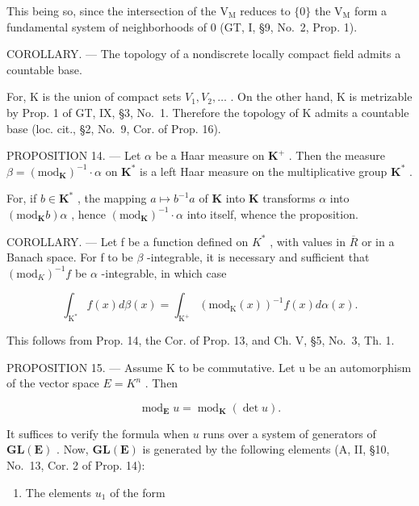 This being so, since the intersection of the \(\mathrm{V_M}\) reduces to \(\{0\}\) the \(\mathrm{V_M}\) form a fundamental system of neighborhoods of 0 (GT, I, §9, No.~2, Prop. 1).

COROLLARY. --- The topology of a nondiscrete locally compact field admits a countable base.

For, K is the union of compact sets \(V_{1}, V_{2}, \ldots\) . On the other hand, K is metrizable by Prop. 1 of GT, IX, §3, No.~1. Therefore the topology of K admits a countable base (loc. cit., §2, No.~9, Cor. of Prop. 16).

PROPOSITION 14. --- Let \(\alpha\) be a Haar measure on \(\mathbf{K}^{+}\) . Then the measure \(\beta = (\mathrm{mod}_{\mathbf{K}})^{-1} \cdot \alpha\) on \(\mathbf{K}^{*}\) is a left Haar measure on the multiplicative group \(\mathbf{K}^{*}\) .

For, if \(b \in \mathbf{K}^*\) , the mapping \(a \mapsto b^{-1}a\) of \(\mathbf{K}\) into \(\mathbf{K}\) transforms \(\alpha\) into \((\mathrm{mod}_{\mathbf{K}}b)\alpha\) , hence \((\mathrm{mod}_{\mathbf{K}})^{-1} \cdot \alpha\) into itself, whence the proposition.

COROLLARY. --- Let f be a function defined on \(K^{*}\) , with values in \(\overline{R}\) or in a Banach space. For f to be \(\beta\) -integrable, it is necessary and sufficient that \((\mathrm{mod}_K)^{-1}f\) be \(\alpha\) -integrable, in which case

\[
\int_ {\mathrm{K} ^ {*}} f (x) d \beta (x) = \int_ {\mathrm{K} ^ {+}} \left(\mathrm{mod} _ {\mathrm{K}} (x)\right) ^ {- 1} f (x) d \alpha (x).
\]

This follows from Prop. 14, the Cor. of Prop. 13, and Ch. V, §5, No.~3, Th. 1.

PROPOSITION 15. --- Assume K to be commutative. Let u be an automorphism of the vector space \(E = K^{n}\) . Then

\[
\operatorname{mod} _ {\mathbf {E}} u = \operatorname{mod} _ {\mathbf {K}} (\det u).
\]

It suffices to verify the formula when \(u\) runs over a system of generators of \(\mathbf{GL}(\mathbf{E})\) . Now, \(\mathbf{GL}(\mathbf{E})\) is generated by the following elements (A, II, §10, No.~13, Cor. 2 of Prop. 14):

\begin{enumerate}
\def\labelenumi{(\alph{enumi})}
\tightlist
\item
  The elements \(u_{1}\) of the form
\end{enumerate}

